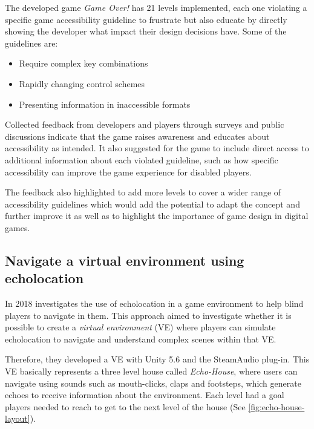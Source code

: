 \documentclass[sigconf,natbib=false,10pt]{acmart}
\begin{document}
	The developed game \emph{Game Over!} has 21 levels implemented, each one violating a specific game accessibility guideline to frustrate but also educate by directly showing the developer what impact their design decisions have. 
	Some of the guidelines are:
	
	\begin{itemize}
		\setlength\itemsep{0.5em}
		\item Require complex key combinations
		\item Rapidly changing control schemes
		\item Presenting information in inaccessible formats
	\end{itemize}

 	Collected feedback from developers and players through surveys and public discussions indicate that the game raises awareness and educates about accessibility as intended.
 	It also suggested for the game to include direct access to additional information about each violated guideline, such as how specific accessibility can improve the game experience for disabled players.
 	
 	The feedback also highlighted to add more levels to cover a wider range of accessibility guidelines which would add the potential to adapt the concept and further improve it as well as to highlight the importance of game design in digital games.
	
	\subsection{Navigate a virtual environment using echolocation}
	In 2018 \textcite{andrade_echo-house_2018} investigates the use of echolocation in a game environment to help blind players to navigate in them.
	This approach aimed to investigate whether it is possible to create a \emph{virtual environment} (VE) where players can simulate echolocation to navigate and understand complex scenes within that VE.
	
	Therefore, they developed a VE with Unity 5.6 and the SteamAudio plug-in.
	This VE basically represents a three level house called \emph{Echo-House}, where users can navigate using sounds such as mouth-clicks, claps and footsteps, which generate echoes to receive information about the environment.
	Each level had a goal players needed to reach to get to the next level of the house (See \autoref{fig:echo-house-layout}).
	
\end{document}
